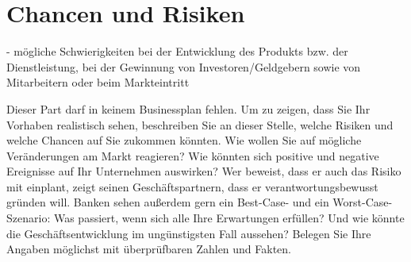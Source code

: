 \section{Chancen und Risiken}
- mögliche Schwierigkeiten bei der Entwicklung des Produkts bzw. der Dienstleistung, bei der Gewinnung von Investoren/Geldgebern sowie von Mitarbeitern oder beim Markteintritt 

Dieser Part darf in keinem Businessplan fehlen. Um zu zeigen, dass Sie Ihr Vorhaben realistisch sehen, beschreiben Sie an dieser Stelle, welche Risiken und welche Chancen auf Sie zukommen könnten. Wie wollen Sie auf mögliche Veränderungen am Markt reagieren? Wie könnten sich positive und negative Ereignisse auf Ihr Unternehmen auswirken? Wer beweist, dass er auch das Risiko mit einplant, zeigt seinen Geschäftspartnern, dass er verantwortungsbewusst gründen will. Banken sehen außerdem gern ein Best-Case- und ein Worst-Case-Szenario: Was passiert, wenn sich alle Ihre Erwartungen erfüllen? Und wie könnte die Geschäftsentwicklung im ungünstigsten Fall aussehen? Belegen Sie Ihre Angaben möglichst mit überprüfbaren Zahlen und Fakten.
